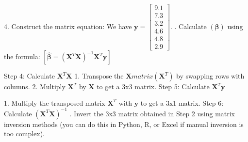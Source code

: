 \documentclass[11pt]{beamer}
\begin{document}
\begin{frame}
	4.	Construct the matrix equation:\linebreak 
	\linebreak 
\hspace*{15pt} We have $\mathbf{y} = \begin{bmatrix} 9.1 \\ 7.3 \\ 3.2 \\ 4.6 \\ 4.8 \\ 2.9 \end{bmatrix}$.
	\linebreak
	.	Calculate $(\boldsymbol{\beta})$ using the formula:
$[\boldsymbol{\hat{\beta}} = (\mathbf{X}^T \mathbf{X})^{-1} \mathbf{X}^T \mathbf{y}]$
\end{frame}

\begin{frame}

Step 4: Calculate $\mathbf{X}^T \mathbf{X}$
\medskip 
\linebreak 
\hspace*{15pt}	1.	Transpose the $\mathbf{X} matrix (\mathbf{X}^T)$ by swapping rows with columns.
\medskip 
\linebreak 
\hspace*{15pt}	2.	Multiply $\mathbf{X}^T$ by $\mathbf{X}$ to get a 3x3 matrix.
\bigskip 
\linebreak 
Step 5: Calculate $\mathbf{X}^T \mathbf{y}$

	1.	Multiply the transposed matrix $\mathbf{X}^T$ with $\mathbf{y}$ to get a 3x1 matrix.
\bigskip 
\linebreak  
Step 6: Calculate $(\mathbf{X}^T \mathbf{X})^{-1}$
\medskip 
{}.	Invert the 3x3 matrix obtained in Step 2 using matrix inversion methods (you can do this in Python, R, or Excel if manual inversion is too complex).
\end{frame}
\end{document}
